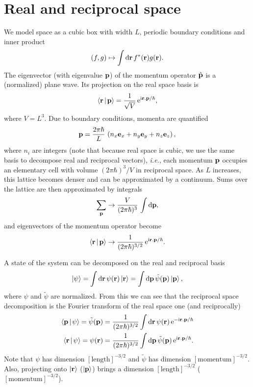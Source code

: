 \section{Real and reciprocal space}

We model space as a cubic box with width $L$, periodic boundary conditions and inner product
\begin{equation}
	(f, g) \mapsto \int \mathrm{d}\mathbf{ r } \, f^{\ast}(\mathbf{ r }) g(\mathbf{ r }) .
	\nonumber
\end{equation}
The eigenvector (with eigenvalue $\mathbf{ p }$) of the momentum operator $\hat{\mathbf{ p }}$ is a (normalized) plane wave. Its projection on the real space basis is
\begin{equation}
	\left\langle \mathbf{ r } \, \right| \left. \! \mathbf{ p } \right\rangle = \frac{1}{\sqrt{V}} \, \mathrm{e}^{\mathrm{i} \mathbf{ r }.\mathbf{ p }/\hbar } ,
	\nonumber
\end{equation}
where $V = L^3$.
Due to boundary conditions, momenta are quantified
\begin{equation}
	\mathbf{ p } = \frac{2\pi\hbar}{L} \, \left( n_x \mathbf{ e }_x  + n_y \mathbf{ e }_y + n_z \mathbf{ e }_z \right) ,
	\nonumber
\end{equation}
where $n_i$ are integers (note that because real space is cubic, we use the same basis to decompose real and reciprocal vectors), \textit{i.e.}, each momentum $\mathbf{ p }$ occupies an elementary cell with volume $(2\pi\hbar)^3/V$ in reciprocal space.
As $L$ increases, this lattice becomes denser and can be approximated by a continuum.
Sums over the lattice are then approximated by integrals
\begin{equation}
	\sum_{\mathbf{ p }} \rightarrow \frac{V}{(2\pi\hbar)^3} \, \int \mathrm{d}\mathbf{ p } ,
	\nonumber
\end{equation}
and eigenvectors of the momentum operator become
\begin{equation}
	\label{eq:planeWave}
	\left\langle \mathbf{ r } \, \right| \left. \! \mathbf{ p } \right\rangle \rightarrow \frac{1}{(2\pi\hbar)^{3/2}} \, \mathrm{e}^{\mathrm{i} \mathbf{ r }.\mathbf{ p }/\hbar } .
\end{equation}

A state of the system can be decomposed on the real and reciprocal basis
\begin{equation}
	\label{eq:decomposition}
	\left| \psi \right\rangle = \int \mathrm{d}\mathbf{ r } \,\psi(\mathbf{ r }) \left| \mathbf{ r } \right\rangle
	= \int \mathrm{d}\mathbf{ p } \,\tilde{\psi}(\mathbf{ p }) \left| \mathbf{ p } \right\rangle ,
\end{equation}
where $\psi$ and $\tilde{\psi}$ are normalized.
From this we can see that the reciprocal space decomposition is the Fourier transform of the real space one (and reciprocally)
\begin{align}
	\left\langle \mathbf{ p } \, \right| \left. \! \psi \right\rangle = \tilde{\psi}(\mathbf{ p }) &
	= \frac{1}{(2\pi\hbar)^{3/2}} \int \mathrm{d}\mathbf{ r } \,\psi(\mathbf{ r }) \, \mathrm{e}^{ -\mathrm{i}\mathbf{ r }.\mathbf{ p }/\hbar } \\
	\left\langle \mathbf{ r } \, \right| \left. \! \psi \right\rangle = \psi(\mathbf{ r }) &
	= \frac{1}{(2\pi\hbar)^{3/2}} \int \mathrm{d}\mathbf{ p } \, \tilde{\psi}(\mathbf{ p }) \, \mathrm{e}^{\mathrm{i} \mathbf{ r }.\mathbf{ p }/\hbar } .
\end{align}
Note that $\psi$ has dimension $[\text{length}]^{-3/2}$ and $\tilde{\psi}$ has dimension $[\text{momentum}]^{-3/2}$. Also, projecting onto $\left| \mathbf{ r } \right\rangle$ ($\left| \mathbf{ p } \right\rangle$) brings a dimension $[\text{length}]^{-3/2}$ ($[\text{momentum}]^{-3/2}$).

